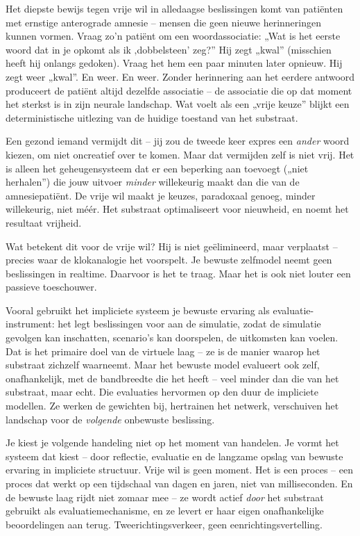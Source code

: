 \documentclass[11pt, twoside, openright]{book}
\begin{document}
Het diepste bewijs tegen vrije wil in alledaagse beslissingen komt van patiënten met ernstige anterograde amnesie -- mensen die geen nieuwe herinneringen kunnen vormen. Vraag zo’n patiënt om een woordassociatie: „Wat is het eerste woord dat in je opkomt als ik ‚dobbelsteen’ zeg?” Hij zegt „kwal” (misschien heeft hij onlangs gedoken). Vraag het hem een paar minuten later opnieuw. Hij zegt weer „kwal”. En weer. En weer. Zonder herinnering aan het eerdere antwoord produceert de patiënt altijd dezelfde associatie -- de associatie die op dat moment het sterkst is in zijn neurale landschap. Wat voelt als een „vrije keuze” blijkt een deterministische uitlezing van de huidige toestand van het substraat.

Een gezond iemand vermijdt dit -- jij zou de tweede keer expres een \textit{ander} woord kiezen, om niet oncreatief over te komen. Maar dat vermijden zelf is niet vrij. Het is alleen het geheugensysteem dat er een beperking aan toevoegt („niet herhalen”) die jouw uitvoer \textit{minder} willekeurig maakt dan die van de amnesiepatiënt. De vrije wil maakt je keuzes, paradoxaal genoeg, minder willekeurig, niet méér. Het substraat optimaliseert voor nieuwheid, en noemt het resultaat vrijheid.

Wat betekent dit voor de vrije wil? Hij is niet geëlimineerd, maar verplaatst -- precies waar de klokanalogie het voorspelt. Je bewuste zelfmodel neemt geen beslissingen in realtime. Daarvoor is het te traag. Maar het is ook niet louter een passieve toeschouwer.

Vooral gebruikt het impliciete systeem je bewuste ervaring als evaluatie-instrument: het legt beslissingen voor aan de simulatie, zodat de simulatie gevolgen kan inschatten, scenario’s kan doorspelen, de uitkomsten kan voelen. Dat is het primaire doel van de virtuele laag -- ze is de manier waarop het substraat zichzelf waarneemt. Maar het bewuste model evalueert ook zelf, onafhankelijk, met de bandbreedte die het heeft -- veel minder dan die van het substraat, maar echt. Die evaluaties hervormen op den duur de impliciete modellen. Ze werken de gewichten bij, hertrainen het netwerk, verschuiven het landschap voor de \textit{volgende} onbewuste beslissing.

Je kiest je volgende handeling niet op het moment van handelen. Je vormt het systeem dat kiest -- door reflectie, evaluatie en de langzame opslag van bewuste ervaring in impliciete structuur. Vrije wil is geen moment. Het is een proces -- een proces dat werkt op een tijdschaal van dagen en jaren, niet van milliseconden. En de bewuste laag rijdt niet zomaar mee -- ze wordt actief \textit{door} het substraat gebruikt als evaluatiemechanisme, en ze levert er haar eigen onafhankelijke beoordelingen aan terug. Tweerichtingsverkeer, geen eenrichtingsvertelling.
\end{document}
